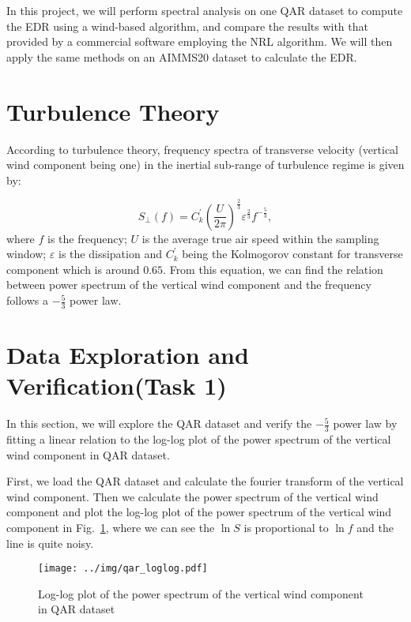 \documentclass[runningheads]{llncs}
\begin{document}
In this project, we will perform spectral analysis on one QAR dataset to compute the EDR using a wind-based algorithm, and compare the results with that provided by a commercial software employing the NRL algorithm. 
We will then apply the same methods on an AIMMS20 dataset to calculate the EDR.

\section{Turbulence Theory}

According to turbulence theory, frequency spectra of transverse velocity (vertical wind component being one) in the inertial sub-range of turbulence regime is given by:

\begin{equation}
    S_{\perp}(f)=C_k^{'}\left(\frac{U}{2\pi}\right)^{\frac23}\varepsilon^{\frac23}f^{-\frac53},
\end{equation}
where $f$ is the frequency; $U$ is the average true air speed within the sampling window; $\varepsilon$ is the dissipation and $C^{'}_k$ being the Kolmogorov constant for transverse
component which is around $0.65$. From this equation, we can find the relation between power spectrum of the vertical wind component and the frequency follows a $-\frac53$ power law.

\section{Data Exploration and Verification(Task 1)}

In this section, we will explore the QAR dataset and verify the $-\frac53$ power law by fitting a linear relation to the log-log plot of the power spectrum of the vertical wind component in QAR dataset.

First, we load the QAR dataset and calculate the fourier transform of the vertical wind component. 
Then we calculate the power spectrum of the vertical wind component 
and plot the log-log plot of the power spectrum of the vertical wind component in Fig.~\ref{fig:qar_loglog},
where we can see the $\ln{S}$ is proportional to $\ln{f}$ and the line is quite noisy.

\begin{figure}[!htbp]
    \centering
    \texttt{[image: ../img/qar\_loglog.pdf]}
    \caption{Log-log plot of the power spectrum of the vertical wind component in QAR dataset}
    \label{fig:qar_loglog}
\end{figure}
\end{document}
